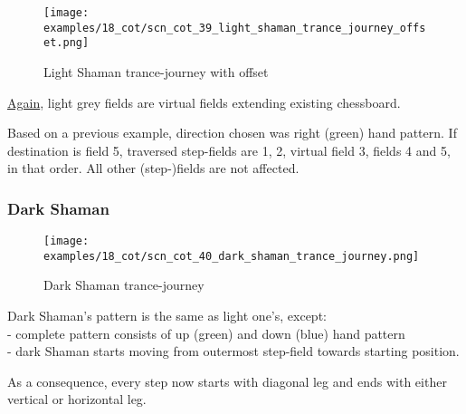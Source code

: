 \clearpage %

\noindent
\begin{figure}[!h]
\texttt{[image: examples/18\_cot/scn\_cot\_39\_light\_shaman\_trance\_journey\_offset.png]}
\caption{Light Shaman trance-journey with offset}
\label{fig:scn_cot_39_light_shaman_trance_journey_offset}
\end{figure}

\hyperref[fig:scn_hd_06_centaur_off_board]{Again},
light grey fields are virtual fields extending existing chessboard.

Based on a previous example, direction chosen was right (green) hand pattern.
If destination is field 5, traversed step-fields are 1, 2, virtual field 3,
fields 4 and 5, in that order. All other (step-)fields are not affected.

\clearpage %

\subsubsection*{Dark Shaman}
\label{sec:Conquest of Tlalocan/Trance-journey/Movement/Dark Shaman}

\vspace*{-1.5\baselineskip}
\noindent
\begin{figure}[!h]
\texttt{[image: examples/18\_cot/scn\_cot\_40\_dark\_shaman\_trance\_journey.png]}
\vspace*{-1.4\baselineskip}
\caption{Dark Shaman trance-journey}
\label{fig:scn_cot_40_dark_shaman_trance_journey}
\end{figure}

\vspace*{-0.5\baselineskip}
Dark Shaman's pattern is the same as light one's, except: \\
- complete pattern consists of up (green) and down (blue) hand pattern \\
- dark Shaman starts moving from outermost step-field towards starting position.

As a consequence, every step now starts with diagonal leg and ends with either
vertical or horizontal leg.

